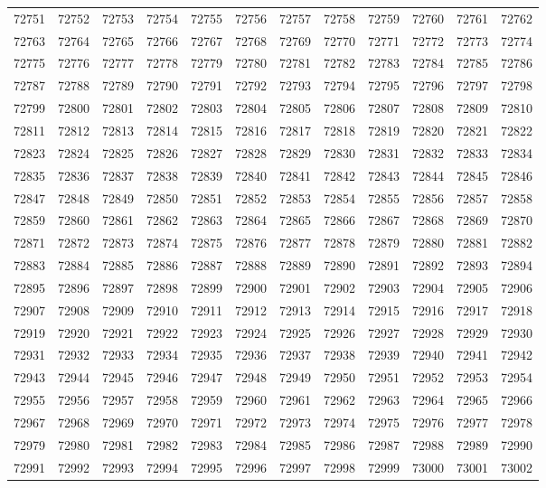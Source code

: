 \begin{center}
\begin{longtable}{llllllllllll}
72751 &72752 &72753 &72754 &72755 &72756 &72757 &72758 &72759 &72760 &72761 &72762 \\
72763 &72764 &72765 &72766 &72767 &72768 &72769 &72770 &72771 &72772 &72773 &72774 \\
72775 &72776 &72777 &72778 &72779 &72780 &72781 &72782 &72783 &72784 &72785 &72786 \\
72787 &72788 &72789 &72790 &72791 &72792 &72793 &72794 &72795 &72796 &72797 &72798 \\
72799 &72800 &72801 &72802 &72803 &72804 &72805 &72806 &72807 &72808 &72809 &72810 \\
72811 &72812 &72813 &72814 &72815 &72816 &72817 &72818 &72819 &72820 &72821 &72822 \\
72823 &72824 &72825 &72826 &72827 &72828 &72829 &72830 &72831 &72832 &72833 &72834 \\
72835 &72836 &72837 &72838 &72839 &72840 &72841 &72842 &72843 &72844 &72845 &72846 \\
72847 &72848 &72849 &72850 &72851 &72852 &72853 &72854 &72855 &72856 &72857 &72858 \\
72859 &72860 &72861 &72862 &72863 &72864 &72865 &72866 &72867 &72868 &72869 &72870 \\
72871 &72872 &72873 &72874 &72875 &72876 &72877 &72878 &72879 &72880 &72881 &72882 \\
72883 &72884 &72885 &72886 &72887 &72888 &72889 &72890 &72891 &72892 &72893 &72894 \\
72895 &72896 &72897 &72898 &72899 &72900 &72901 &72902 &72903 &72904 &72905 &72906 \\
72907 &72908 &72909 &72910 &72911 &72912 &72913 &72914 &72915 &72916 &72917 &72918 \\
72919 &72920 &72921 &72922 &72923 &72924 &72925 &72926 &72927 &72928 &72929 &72930 \\
72931 &72932 &72933 &72934 &72935 &72936 &72937 &72938 &72939 &72940 &72941 &72942 \\
72943 &72944 &72945 &72946 &72947 &72948 &72949 &72950 &72951 &72952 &72953 &72954 \\
72955 &72956 &72957 &72958 &72959 &72960 &72961 &72962 &72963 &72964 &72965 &72966 \\
72967 &72968 &72969 &72970 &72971 &72972 &72973 &72974 &72975 &72976 &72977 &72978 \\
72979 &72980 &72981 &72982 &72983 &72984 &72985 &72986 &72987 &72988 &72989 &72990 \\
72991 &72992 &72993 &72994 &72995 &72996 &72997 &72998 &72999 &73000 &73001 &73002 \\

\end{longtable}
\end{center}
